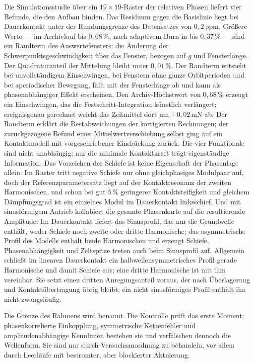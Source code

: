 \documentclass[12pt,a4paper]{report}
\begin{document}
Die Simulationsstudie über ein $19\times19$-Raster der relativen Phasen
liefert vier Befunde, die den Aufbau binden. Das Residuum gegen die
Basislinie liegt bei Dauerkontakt unter der Rundungsgrenze des
Datensatzes von $0{,}2\,\mathrm{ppm}$. Größere Werte
--- im Archivlauf bis $0{,}68\,\%$, nach adaptivem Burn-in bis
$0{,}37\,\%$ --- sind ein Randterm des Auswertefensters: die
Änderung der Schwerpunktsgeschwindigkeit über das Fenster, bezogen auf
$g$ und Fensterlänge. Der Quadraturanteil der Mittelung bleibt unter
$0{,}01\,\%$. Der Randterm entsteht bei unvollständigem Einschwingen, bei
Fenstern ohne ganze Orbitperioden und bei aperiodischer Bewegung, fällt
mit der Fensterlänge ab und kann als phasenabhängiger Effekt erscheinen.
Den Archiv-Höchstwert von $0{,}68\,\%$ erzeugt ein Einschwingen, das die
Festschritt-Integration künstlich verlängert; ereignisgenau gerechnet
weicht das Zeitmittel dort um $+0{,}02\,\mathrm{mN}$ ab. Der Randterm
erklärt die Restabweichungen der korrigierten Rechnungen; der
zurückgezogene Befund einer Mittelwertverschiebung selbst ging auf ein
Kontaktmodell mit vorgeschriebener Eindrückung zurück. Die vier
Funktionale sind nicht unabhängig; nur die minimale Kontaktkraft trägt
eigenständige Information. Das Vorzeichen der Schiefe ist keine
Eigenschaft der Phasenlage allein: Im Raster tritt negative Schiefe nur
ohne gleichphasiges Modulpaar auf, doch der Referenzparametersatz liegt
auf der Kontaktresonanz der zweiten Harmonischen, und schon bei gut
$5\,\%$ geringerer Kontaktsteifigkeit und gleichem Dämpfungsgrad ist ein
einzelnes Modul im Dauerkontakt linksschief. Und mit sinusförmigem Antrieb kollabiert die gesamte
Phasenkarte auf die resultierende Amplitude: Im Dauerkontakt liefert das
Sinusprofil, das nur die Grundwelle enthält, weder Schiefe noch zweite
oder dritte Harmonische; das asymmetrische Profil des Modells enthält
beide Harmonischen und erzeugt Schiefe. Phasenabhängigkeit und Zeltspitze
treten auch beim Sinusprofil auf. Allgemein schließt im linearen
Dauerkontakt ein halbwellensymmetrisches Profil gerade Harmonische und
damit Schiefe aus; eine dritte Harmonische ist mit ihm vereinbar. Sie setzt
einen dritten Anregungsanteil voraus, der nach Überlagerung und
Kontaktübertragung übrig bleibt; ein nicht sinusförmiges Profil enthält
ihn nicht zwangsläufig.

Die Grenze des Rahmens wird benannt. Die Kontrolle prüft das erste
Moment; phasenkorrelierte Einkopplung, symmetrische Kettenfehler und
amplitudenabhängige Kennlinien bestehen sie und verfälschen dennoch die
Wellenform. Sie sind nur durch Versuchsanordnung zu behandeln, vor allem
durch Leerläufe mit bestromter, aber blockierter Aktuierung.
\end{document}
